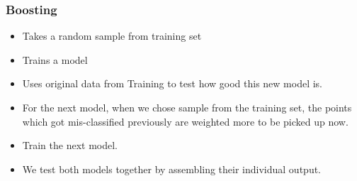 %
%
%
%

\begin{frame}[fragile]\frametitle{Boosting}
\begin{itemize}
\item Takes a random sample from training set
\item Trains a model
\item Uses original data from Training to test how good this new model is.
\item For the next model, when we chose sample from the training set, the points which got mis-classified previously are weighted more to be picked up now.
\item Train the next model.
\item We test both models together by assembling their individual output.
\end{itemize}
\end{frame}


